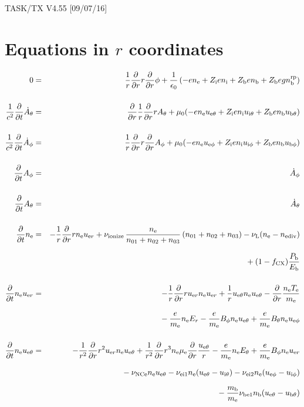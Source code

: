 \documentclass[11pt]{article}
\def\r#1{{\rm#1}}
\def\ddt{\frac{\partial}{\partial t}}
\def\ddr{\frac{\partial}{\partial r}}
\def\me{m_\r{e}}
\def\mb{m_\r{b}}
\def\mue{\mu_\r{e}}
\def\nee{n_\r{e}}
\def\ni{n_\r{i}}
\def\nb{n_\r{b}}
\def\uer{u_{\r{e}r}}
\def\ueth{u_{\r{e}\theta}}
\def\uith{u_{\r{i}\theta}}
\def\ubth{u_{\r{b}\theta}}
\def\ueph{u_{\r{e}\phi}}
\def\uiph{u_{\r{i}\phi}}
\def\ubph{u_{\r{b}\phi}}
\def\Er{E_r}
\def\Eth{E_\theta}
\def\Bth{B_\theta}
\def\Bph{B_\phi}
\def\Athd{\dot{A}_\theta}
\def\Aphd{\dot{A}_\phi}
\def\Ath{A_\theta}
\def\Aph{A_\phi}
\def\Te{T_\r{e}}
\def\nna{n_{01}}
\def\nnb{n_{02}}
\def\nnc{n_{03}}
\def\Zi{Z_\r{i}}
\def\Zb{Z_\r{b}}
\def\Pb{P_\r{b}}
\def\Eb{E_\r{b}}
\def\nbrp{n_\r{b}^\r{rp}}
\def\fCX{f_\r{CX}}
\def\nuNCe{\nu_\r{NCe}}
\def\nuL{\nu_\r{L}}
\def\nuion{\nu_\r{ionize}}
\def\nediv{n_\r{ediv}}
\begin{document}
\begin{center}
TASK/TX V4.55 [09/07/16]
\end{center}

\section{Equations in $r$ coordinates}
\vspace{-5mm}

\begin{eqnarray}
  0 &=&
%
    \frac{1}{r} \ddr r \ddr \phi
%
  + \frac{1}{\epsilon_0}
%
    \left(-e \nee + \Zi e \ni + \Zb e \nb + \Zb e g \nbrp \right)
\\[5mm]
  \frac{1}{c^2} \ddt \Athd &=&
%
    \ddr \frac{1}{r} \ddr r \Ath
%
  + \mu_0 (-e \nee \ueth + \Zi e \ni \uith + \Zb e \nb \ubth)
\\[5mm]
  \frac{1}{c^2} \ddt \Aphd &=&
%
  \frac{1}{r} \ddr r \ddr \Aph
%
  + \mu_0 (-e \nee \ueph + \Zi e \ni \uiph + \Zb e \nb \ubph)
%
\\[5mm]
  \ddt \Aph &=&
%
  \Aphd
\\[5mm]
  \ddt \Ath &=&
%
  \Athd
\\[5mm]
  \ddt\nee &=&
%
  - \frac{1}{r} \ddr r \nee \uer 
%
  + \nuion\, \frac{\nee}{\nna + \nnb + \nnc}\, (\nna + \nnb + \nnc)
%
  - \nuL (\nee - \nediv)
\nonumber\\[3mm]&&{}
%
  + (1 - \fCX) \frac{\Pb}{\Eb}
\\[5mm]
  \ddt \nee \uer &=&
%
  - \frac{1}{r} \ddr r \uer \nee \uer
%
  + \frac{1}{r} \ueth \nee \ueth
%
  - \ddr \frac{\nee \Te}{\me}
\nonumber\\[3mm]&&{}
%
  - \frac{e}{\me} \nee \Er
%
  - \frac{e}{\me} \Bph \nee \ueth
%
  + \frac{e}{\me} \Bth \nee \ueph
\\[5mm]
  \ddt \nee \ueth &=&
%
  - \frac{1}{r^2} \ddr r^2 \uer \nee \ueth
%
  + \frac{1}{r^2} \ddr r^3 \nee \mue \ddr \frac{\ueth}{r}
%
  - \frac{e}{\me} \nee \Eth
%
  + \frac{e}{\me} \Bph \nee \uer
\nonumber\\[2.5mm]&&{}
%
  - \nuNCe \nee \ueth
%
  - \nu_\r{ei1} \nee (\ueth - \uith)
%
  - \nu_\r{ei2} \nee (\ueph - \uiph)
\nonumber\\[2.5mm]&&{}
%
  - \frac{\mb}{\me} \nu_\r{be1} \nb (\ueth - \ubth)

\end{eqnarray}
\end{document}
